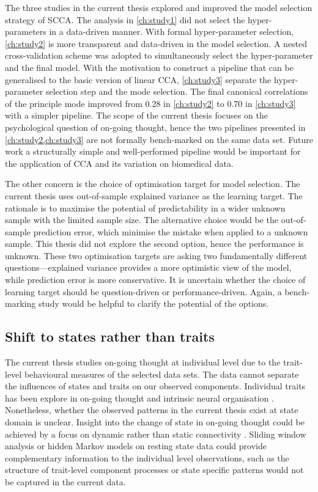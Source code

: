 The three studies in the current thesis explored and improved the model selection strategy of SCCA. The analysis in \cref{ch:study1} did not select the hyper-parameters in a data-driven manner. With formal hyper-parameter selection, \cref{ch:study2} is more transparent and data-driven in the model selection. A nested cross-validation scheme was adopted to simultaneously select the hyper-parameter and the final model. With the motivation to construct a pipeline that can be generalised to the basic version of linear CCA, \cref{ch:study3} separate the hyper-parameter selection step and the mode selection. The final canonical correlations of the principle mode improved from 0.28 in \cref{ch:study2} to 0.70 in \cref{ch:study3} with a simpler pipeline. The scope of the current thesis focuses on the psychological question of on-going thought, hence the two pipelines presented in \cref{ch:study2,ch:study3} are not formally bench-marked on the same data set. Future work a structurally simple and well-performed pipeline would be important for the application of CCA and its variation on biomedical data.

The other concern is the choice of optimisation target for model selection. The current thesis uses out-of-sample explained variance as the learning target. The rationale is to maximise the potential of predictability in a wider unknown sample with the limited sample size. The alternative choice would be the out-of-sample prediction error, which minimise the mistake when applied to a unknown sample. This thesis did not explore the second option, hence the performance is unknown. These two optimisation targets are asking two fundamentally different questions---explained variance provides a more optimistic view of the model, while prediction error is more conservative. It is uncertain whether the choice of learning target should be question-driven or performance-driven. Again, a bench-marking study would be helpful to clarify the potential of the options. 

\subsection{Shift to states rather than traits}

The current thesis studies on-going thought at individual level due to the trait-level behavioural measures of the selected data sets. The data cannot separate the influences of states and traits on our observed components. Individual traits has been explore in on-going thought \cite{Smallwood2016,McVay2009,RubyPlos2013} and intrinsic neural organisation \cite{Smith2015}. Nonetheless, whether the observed patterns in the current thesis exist at state domain is unclear. Insight into the change of state in on-going thought could be achieved by a focus on dynamic rather than static connectivity \cite{KucyiNI2017}. Sliding window analysis \cite{Chang2010} or hidden Markov models \cite{Vidaurre2017} on resting state data could provide complementary information to the individual level observations, such as the structure of trait-level component processes or state specific patterns would not be captured in the current data.

